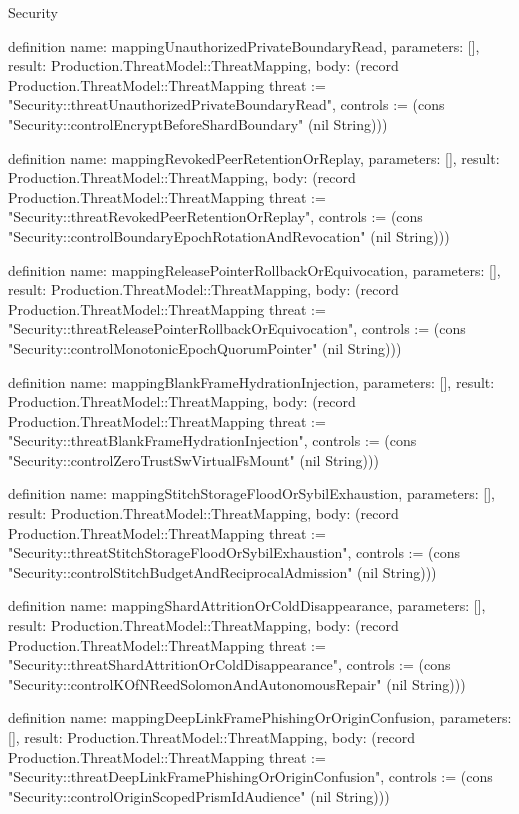 \begin{lexlean}{Security}
\begin{semanticmodule}
definition{
  name: mappingUnauthorizedPrivateBoundaryRead,
  parameters: [],
  result: Production.ThreatModel::ThreatMapping,
  body: (record Production.ThreatModel::ThreatMapping {threat := "Security::threatUnauthorizedPrivateBoundaryRead", controls := (cons "Security::controlEncryptBeforeShardBoundary" (nil String))})
}

definition{
  name: mappingRevokedPeerRetentionOrReplay,
  parameters: [],
  result: Production.ThreatModel::ThreatMapping,
  body: (record Production.ThreatModel::ThreatMapping {threat := "Security::threatRevokedPeerRetentionOrReplay", controls := (cons "Security::controlBoundaryEpochRotationAndRevocation" (nil String))})
}

definition{
  name: mappingReleasePointerRollbackOrEquivocation,
  parameters: [],
  result: Production.ThreatModel::ThreatMapping,
  body: (record Production.ThreatModel::ThreatMapping {threat := "Security::threatReleasePointerRollbackOrEquivocation", controls := (cons "Security::controlMonotonicEpochQuorumPointer" (nil String))})
}

definition{
  name: mappingBlankFrameHydrationInjection,
  parameters: [],
  result: Production.ThreatModel::ThreatMapping,
  body: (record Production.ThreatModel::ThreatMapping {threat := "Security::threatBlankFrameHydrationInjection", controls := (cons "Security::controlZeroTrustSwVirtualFsMount" (nil String))})
}

definition{
  name: mappingStitchStorageFloodOrSybilExhaustion,
  parameters: [],
  result: Production.ThreatModel::ThreatMapping,
  body: (record Production.ThreatModel::ThreatMapping {threat := "Security::threatStitchStorageFloodOrSybilExhaustion", controls := (cons "Security::controlStitchBudgetAndReciprocalAdmission" (nil String))})
}

definition{
  name: mappingShardAttritionOrColdDisappearance,
  parameters: [],
  result: Production.ThreatModel::ThreatMapping,
  body: (record Production.ThreatModel::ThreatMapping {threat := "Security::threatShardAttritionOrColdDisappearance", controls := (cons "Security::controlKOfNReedSolomonAndAutonomousRepair" (nil String))})
}

definition{
  name: mappingDeepLinkFramePhishingOrOriginConfusion,
  parameters: [],
  result: Production.ThreatModel::ThreatMapping,
  body: (record Production.ThreatModel::ThreatMapping {threat := "Security::threatDeepLinkFramePhishingOrOriginConfusion", controls := (cons "Security::controlOriginScopedPrismIdAudience" (nil String))})
}


\end{semanticmodule}
\end{lexlean}

